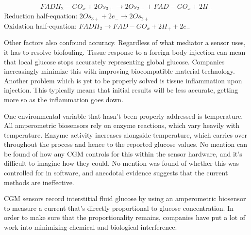\begin{equation} \label{eq:four}
FADH_2 - GO_x + 2Os_{3+} \rightarrow  2Os_{2+} + FAD-GO_x + 2H_+ 
\end{equation}
Reduction half-equation: $2Os_{3+} + 2e_- \rightarrow 2Os_{2+}$\\ 
Oxidation half-equation: $FADH_2 \rightarrow FAD-GO_x + 2H_+ + 2e_-$ 

Other factors also confound accuracy. Regardless of what mediator a sensor uses, it has to resolve biofouling. Tissue response to a foreign body injection can mean that local glucose stops accurately representing global glucose. Companies increasingly minimize this with improving biocompatible material technology. Another problem which is yet to be properly solved is tissue inflammation upon injection. This typically means that initial results will be less accurate, getting more so as the inflammation goes down.

One environmental variable that hasn’t been properly addressed is temperature. All amperometric biosensors rely on enzyme reactions, which vary heavily with temperature\cite{noauthor_accuracy_nodate}. Enzyme activity increases alongside temperature, which carries over throughout the process and hence to the reported glucose values. No mention can be found of how any CGM controls for this within the sensor hardware, and it’s difficult to imagine how they could. No mention was found of whether this was controlled for in software, and anecdotal evidence suggests that the current methods are ineffective.

CGM sensors record interstitial fluid glucose by using an amperometric biosensor to measure a current that’s directly proportional to glucose concentration. In order to make sure that the proportionality remains, companies have put a lot of work into minimizing chemical and biological interference. 


